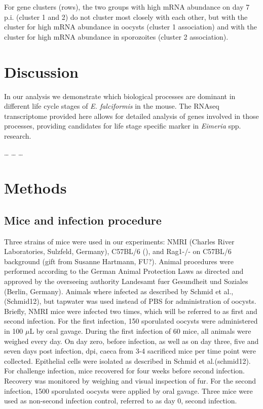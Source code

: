 \documentclass{bmcart}
\begin{document}
For gene clusters (rows), the two groups with high mRNA abundance on
day 7 p.i. (cluster 1 and 2) do not cluster most closely with each
other, but with the cluster for high mRNA abundance in oocysts
(cluster 1 association) and with the cluster for high mRNA abundance
in sporozoites (cluster 2 association).


\section*{Discussion}
In our analysis we demonstrate which biological processes are dominant
in different life cycle stages of \textit{E. falciformis} in the
mouse. The RNAseq transcriptome provided here allows for detailed
analysis of genes involved in those processes, providing candidates
for life stage specific marker in \textit{Eimeria} spp. research.

\ldots
\ldots
\ldots


\section{Methods}
\subsection{Mice and infection procedure}
Three strains of mice were used in our experiments: NMRI (Charles
River Laboratories, Sulzfeld, Germany), C57BL/6 (), and Rag1-/- on
C57BL/6 background (gift from Susanne Hartmann, FU?).  Animal
procedures were performed according to the German Animal Protection
Laws as directed and approved by the overseeing authority Landesamt
fuer Gesundheit und Soziales (Berlin, Germany). Animals where infected
as described by Schmid et al., (Schmid12), but tapwater was used
instead of PBS for administration of oocysts. Briefly, NMRI mice were
infected two times, which will be referred to as first and second
infection. For the first infection, 150 sporulated oocysts were
administered in 100 $μ$L by oral gavage. During the first infection of
60 mice, all animals were weighed every day. On day zero, before
infection, as well as on day three, five and seven days post
infection, dpi, caeca from 3-4 sacrificed mice per time point were
collected. Epithelial cells were isolated as described in Schmid et
al.(schmid12). For challenge infection, mice recovered for four weeks
before second infection.  Recovery was monitored by weighing and
visual inspection of fur. For the second infection, 1500 sporulated
oocysts were applied by oral gavage. Three mice were used as
non-second infection control, referred to as day 0, second infection.
\end{document}
